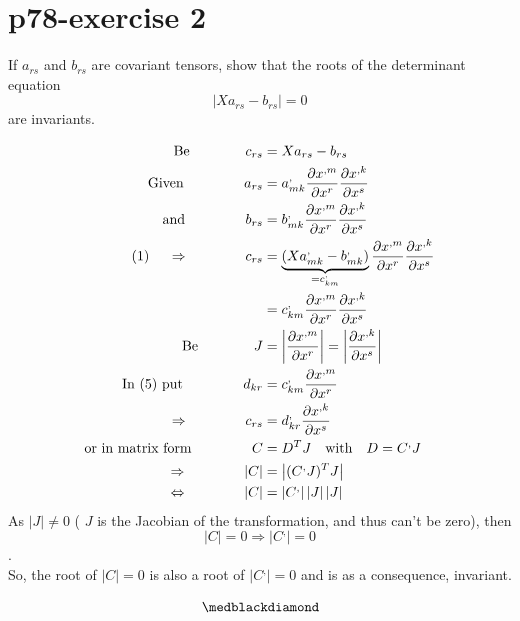 \section{p78-exercise 2}
\begin{tcolorbox}
If $a_{rs}$ and $b_{rs}$ are covariant tensors, show that the roots of the determinant equation $$\left|Xa_{rs} - b_{rs}\right |= 0$$ are invariants.
\end{tcolorbox}
\begin{align}
\text{Be}\quad\quad\quad\quad c_{rs} &= Xa_{rs} - b_{rs}\\
\text{Given }\quad\quad\quad\quad a_{rs} &= a^{,}_{mk}\pdv{x^{,m}}{x^r} \pdv{x^{,k}}{x^s}\\
\text{and }\quad\quad\quad\quad b_{rs} &= b^{,}_{mk}\pdv{x^{,m}}{x^r} \pdv{x^{,k}}{x^s}\\
\text{(1) }\quad\Rightarrow\quad\quad\quad\quad c_{rs} &= \underbrace{(Xa^{,}_{mk}-b^{,}_{mk})}_{=c^{,}_{km}} \pdv{x^{,m}}{x^r} \pdv{x^{,k}}{x^s}\\
\ &= c^{,}_{km} \pdv{x^{,m}}{x^r} \pdv{x^{,k}}{x^s}\\
\text{Be}\quad\quad\quad\quad J &= \left |\pdv{x^{,m}}{x^r}\right |= \left |\pdv{x^{,k}}{x^s}\right |\\
\text{In (5) put  }\quad\quad\quad\quad d_{kr} &= c^{,}_{km} \pdv{x^{,m}}{x^r} \\
\Rightarrow\quad\quad\quad\quad c_{rs} &= d^{,}_{kr} \pdv{x^{,k}}{x^s}\\
\text{or in matrix form  } \quad\quad\quad\quad C &= D^T J\quad \text{with}\quad D = C^{,}J\\
\Rightarrow\quad\quad\quad\quad \left |C \right| &= \left | (C^{,}J)^T J\right |\\
\Leftrightarrow\quad\quad\quad\quad \left |C \right| &= \left | C^{,}\right | \left |J\right |\left |J\right |
\end{align}
As $ \left |J\right | \ne 0$ ( $J$ is the Jacobian of the transformation, and thus can't be zero), then $$\left |C \right| = 0 \Rightarrow \left |C^{,} \right| = 0$$.\\
So, the root of $\left |C \right| = 0 $ is also a root of $\left |C^{,} \right| = 0$ and is as a consequence, invariant.

$$\medblackdiamond$$
\newpage


